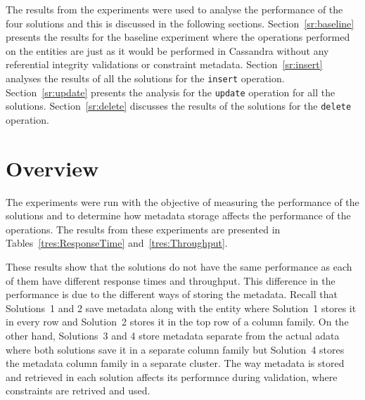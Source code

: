  The results from the experiments were used to
analyse the performance of the four solutions  and this is discussed in the
following sections. 
Section~\ref{sr:baseline} presents the results for the
baseline experiment where the operations performed on the entities are just as
it would be performed in Cassandra without any referential integrity validations
or constraint metadata.
Section~\ref{sr:insert} analyses the results of all the solutions for the
\texttt{insert} operation.
Section~\ref{sr:update} presents the analysis for the \texttt{update} operation
for all the solutions.
Section~\ref{sr:delete} discusses the results of the solutions for the
\texttt{delete} operation.

\newcommand{\Width}{0.5\textwidth}
\newcommand{\TB}[1]{\textbf{#1}}

\section{Overview}
The experiments were run with the objective of measuring the performance of the
solutions and to determine how metadata storage affects the performance of the
operations. The results from these experiments are presented in
Tables~\ref{tres:ResponseTime} and~\ref{tres:Throughput}.

These results show that the solutions do not have the same performance as each
of them have different response times and throughput. This difference in the
performance is due to the different ways of storing the metadata. Recall that
Solutions~1 and 2 save metadata along with the entity where Solution~1 stores it
in every row and Solution~2 stores it in the top row of a column family. On the
other hand, Solutions~3 and 4 store metadata separate from the actual adata
where both solutions save it in a separate column family but Solution~4 stores
the metadata column family in a separate cluster. The way metadata is stored and
retrieved in each solution affects its performnce during validation, where
constraints are retrived and used.

